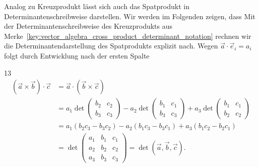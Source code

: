 \clearpage
Analog zu Kreuzprodukt lässt sich auch das Spatprodukt in Determinantenschreibweise
darstellen. Wir werden im Folgenden zeigen, dass
Mit der Determinantenschreibweise des Kreuzprodukts aus
Merke~\ref{key:vector_algebra_cross_product_determinant_notation} rechnen wir
die Determinantendarstellung des Spatprodukts explizit nach. Wegen
$\vec a\cdot\vec e_i=a_i$ folgt durch Entwicklung nach der ersten Spalte
\begin{ClozeArea}[34]{13}
  \[
    \begin{aligned}
      (\vec a\times\vec b)\cdot\vec c
      &=\vec a\cdot(\vec b\times\vec c)\\[1.2em]
      &=a_1\det\!\begin{pmatrix}b_2&c_2\\b_3&c_3\end{pmatrix}
        -a_2\det\!\begin{pmatrix}b_1&c_1\\b_3&c_3\end{pmatrix}
        +a_3\det\!\begin{pmatrix}b_1&c_1\\b_2&c_2\end{pmatrix}
        \\[1.2em]
      &=a_1(b_2c_3-b_3c_2)
        -a_2(b_1c_3-b_3c_1)
        +a_3(b_1c_2-b_2c_1)
        \\[1.2em]
      &=\det\!\begin{pmatrix}
          a_1&b_1&c_1\\
          a_2&b_2&c_2\\
          a_3&b_3&c_3
        \end{pmatrix}
        =\det(\vec a,\vec b,\vec c).
    \end{aligned}
  \]
\end{ClozeArea}

